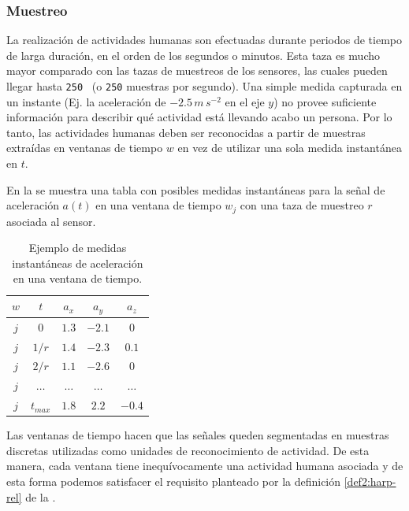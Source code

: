 \subsubsection{Muestreo}

\label{ssec44:sampling}La realización de actividades humanas son
efectuadas durante periodos de tiempo de larga duración, en el orden
de los segundos o minutos. Esta taza es mucho mayor comparado con
las tazas de muestreos de los sensores, las cuales pueden llegar hasta
\texttt{250 } (o \texttt{250} muestras por segundo). Una
simple medida capturada en un instante (Ej. la aceleración de $-2.5\,m\,s^{-2}$
en el eje $y$) no provee suficiente información para describir qué
actividad está llevando acabo un persona. Por lo tanto, las actividades
humanas deben ser reconocidas a partir de muestras extraídas en ventanas
de tiempo $w$ en vez de utilizar una sola medida instantánea en $t$. 

En la  se muestra una tabla con posibles medidas
instantáneas para la señal de aceleración $a(t)$ en una ventana de
tiempo $w_{j}$ con una taza de muestreo $r$ asociada al sensor.

\begin{table}[!tbph]
\begin{centering}
\begin{tabular}{|c|c|c|c|c|}
\hline 
$w$ & $t$ & $a_{x}$ & $a_{y}$ & $a_{z}$\tabularnewline
\hline 
\hline 
$j$ & $0$ & \texttt{$1.3$} & \texttt{$-2.1$} & \texttt{$0$}\tabularnewline
\hline 
$j$ & $1/r$ & \texttt{$1.4$} & \texttt{$-2.3$} & \texttt{$0.1$}\tabularnewline
\hline 
$j$ & $2/r$ & \texttt{$1.1$} & \texttt{$-2.6$} & \texttt{$0$}\tabularnewline
\hline 
$j$ & $\ldots$ & \texttt{$\ldots$} & \texttt{$\ldots$} & \texttt{$\ldots$}\tabularnewline
\hline 
$j$ & $t_{max}$ & \texttt{$1.8$} & \texttt{$2.2$} & \texttt{$-0.4$}\tabularnewline
\hline 
\end{tabular}
\par\end{centering}
\caption[Medidas instantáneas de aceleración ]{\label{tab4:ex-signal}Ejemplo de medidas instantáneas de aceleración
en una ventana de tiempo.}
\end{table}

Las ventanas de tiempo hacen que las señales queden segmentadas en
muestras discretas utilizadas como unidades de reconocimiento de actividad.
De esta manera, cada ventana tiene inequívocamente una actividad humana
asociada y de esta forma podemos satisfacer el requisito planteado
por la definición \ref{def2:harp-rel} de la . 

